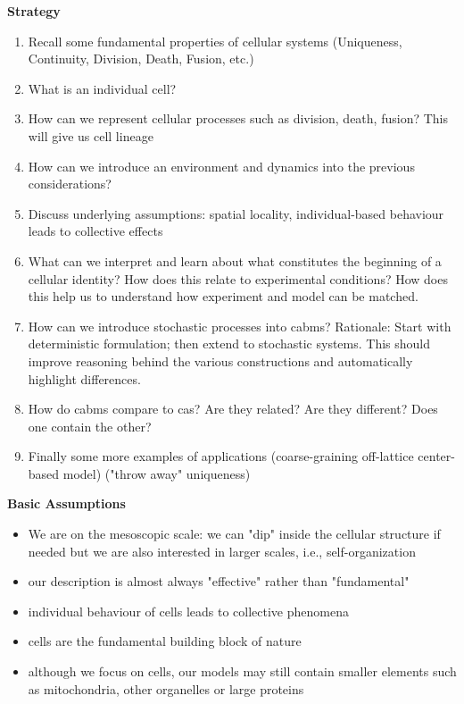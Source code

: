 \textbf{Strategy}
\begin{enumerate}
    \item Recall some fundamental properties of cellular systems (Uniqueness, Continuity, Division,
        Death, Fusion, etc.)
    \item What is an individual cell?
    \item How can we represent cellular processes such as division, death, fusion? This will give us
        cell lineage
    \item How can we introduce an environment and dynamics into the previous considerations?
    \item Discuss underlying assumptions: spatial locality, individual-based behaviour leads to
        collective effects
    \item What can we interpret and learn about what constitutes the beginning of a cellular
        identity? How does this relate to experimental conditions? How does this help us to
        understand how experiment and model can be matched.
    \item How can we introduce stochastic processes into \acp{cabm}?
        Rationale: Start with deterministic formulation; then extend to stochastic systems.
        This should improve reasoning behind the various constructions and automatically highlight
        differences.
    \item How do \acp{cabm} compare to \acp{ca}? Are they related? Are they different? Does one
        contain the other?
    \item Finally some more examples of applications (coarse-graining off-lattice center-based
        model) ("throw away" uniqueness)
\end{enumerate}

\textbf{Basic Assumptions}
\begin{itemize}
    \item We are on the mesoscopic scale: we can "dip" inside the cellular structure if needed but
        we are also interested in larger scales, i.e., self-organization
    \item our description is almost always "effective" rather than "fundamental"
    \item individual behaviour of cells leads to collective phenomena
    \item cells are the fundamental building block of nature
    \item although we focus on cells, our models may still contain smaller elements such as
        mitochondria, other organelles or large proteins
\end{itemize}

